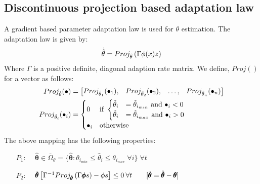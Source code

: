 \subsection{Discontinuous projection based adaptation law}
A gradient based parameter adaptation law is used for $\theta$ estimation. The
adaptation law is given by:
\begin{align}
    \dot{\hat{\theta}} &= Proj_{\hat{\theta}}\left( \Gamma \phi(x) z \right) \\
\end{align}
Where $\Gamma$ is a positive definite, diagonal adaption rate matrix.
We define,  $Proj()$ for a vector as follows:
\begin{align}
    Proj_{\hat{\theta}} (\bullet) &= \begin{bmatrix} Proj_{\hat \theta_1}(\bullet_1), &
                                        Proj_{\hat \theta_2}(\bullet_2), &
                                        \hdots, &
                                        Proj_{\hat \theta_n}(\bullet_n) \end{bmatrix}\\
    Proj_{\hat \theta_i}(\bullet_i)
    &= \begin{cases}
        0 & \text{if } \begin{cases}
                        \hat \theta_i &= \hat \theta_{i_{min}} \text{  and  } \bullet_i < 0\\
                        \hat \theta_i &= \hat \theta_{i_{max}} \text{  and  } \bullet_i > 0\\
                       \end{cases}\\
        \bullet_i & \text{otherwise}
    \end{cases}
\end{align}
The above mapping has the following properties:
\begin{itemize}
    \item[$P_1$:] $\quad \hat{\pmb \theta} \in \bar \Omega_{\theta}=\{\hat{\pmb \theta} : \theta_{i_{min}} \leq \hat \theta_i \leq \theta_{i_{max}} \; \forall i\} \; \forall t$

    \item[$P_2$:] $\quad \tilde{\pmb{\theta}} \left[ \Gamma^{-1}
    Proj_{\hat{\pmb\theta}} \left( \Gamma \pmb \phi s \right) - \phi s \right] \leq 0 \:
    \forall t \qquad [\tilde{\pmb{\theta}} = \hat{\pmb\theta} - \pmb \theta]$
\end{itemize}

